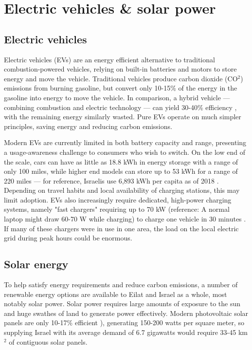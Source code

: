 \documentclass{report}                         %
\begin{document}

\section{Electric vehicles \& solar power}
\subsection{Electric vehicles}
Electric vehicles (EVs) are an energy efficient alternative to traditional combustion-powered vehicles, relying on built-in batteries and motors to store energy and move the vehicle. Traditional vehicles produce carbon dioxide (CO$^2$) emissions from burning gasoline, but convert only 10-15\% of the energy in the gasoline into energy to move the vehicle. In comparison, a hybrid vehicle --- combining combustion and electric technology --- can yield 30-40\% efficiency \cite{Zhu2015DistributedGrid}, with the remaining energy similarly wasted. Pure EVs operate on much simpler principles, saving energy and reducing carbon emissions.

Modern EVs are currently limited in both battery capacity and range, presenting a usage-awareness challenge to consumers who wish to switch. On the low end of the scale, cars can have as little as 18.8 kWh in energy storage with a range of only 100 miles, while higher end models can store up to 53 kWh for a range of 220 miles \cite{Ustun2015ImpactSystems} --- for reference, Israelis use 6,893 kWh per capita as of 2018 \cite{2018Key2018}. Depending on travel habits and local availability of charging stations, this may limit adoption. EVs also increasingly require dedicated, high-power charging systems, namely "fast chargers" requiring up to 70 kW (reference: A normal laptop might draw 60-70 W while charging) to charge one vehicle in 30 minutes \cite{Ustun2015ImpactSystems}. If many of these chargers were in use in one area, the load on the local electric grid during peak hours could be enormous.

\subsection{Solar energy}
To help satisfy energy requirements and reduce carbon emissions, a number of renewable energy options are available to Eilat and Israel as a whole, most notably solar power. Solar power requires large amounts of exposure to the sun and huge swathes of land to generate power effectively. Modern photovoltaic solar panels are only 10-17\% efficient \cite{Zhu2015DistributedGrid}), generating 150-200 watts per square meter, so supplying Israel with its average demand of 6.7 gigawatts would require 33-45 km$^2$ of contiguous solar panels.
\end{document}
